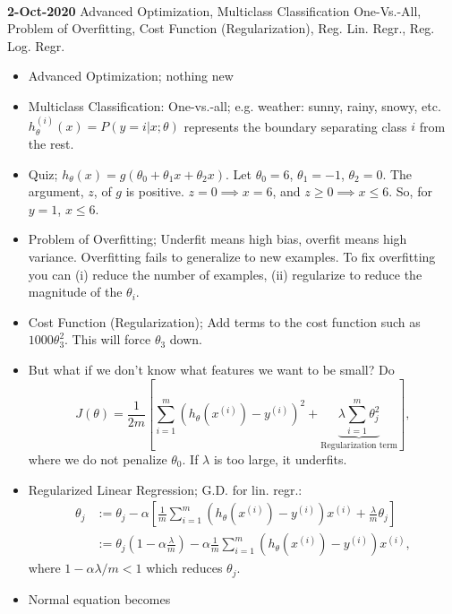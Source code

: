 \documentclass[10pt]{article}
\begin{document}
\hfill \\
{\large \textbf{2-Oct-2020} Advanced Optimization, Multiclass Classification One-Vs.-All, Problem of Overfitting, Cost Function (Regularization), Reg. Lin. Regr., Reg. Log. Regr.}
\begin{itemize}
  \item Advanced Optimization; nothing new
  \item Multiclass Classification: One-vs.-all; e.g. weather: sunny, rainy, snowy, etc. $h_{\theta}^{(i)}(x) = P \left( \left. y=i \right| x; \theta \right)$ represents the boundary separating class $i$ from the rest.
  \item Quiz; $h_{\theta}(x) = g(\theta_0 + \theta_1x + \theta_2x)$. Let $\theta_0=6$, $\theta_1=-1$, $\theta_2=0$. The argument, $z$, of $g$ is positive.  $z=0 \implies x=6$, and $z \geq 0 \implies x \leq 6$. So, for $y=1$, $x \leq 6$.
  \item Problem of Overfitting; Underfit means high bias, overfit means high variance. Overfitting fails to generalize to new examples. To fix overfitting you can (i) reduce the number of examples, (ii) regularize to reduce the magnitude of the $\theta_i$.
  \item Cost Function (Regularization); Add terms to the cost function such as $1000\theta_3^2$. This will force $\theta_3$ down.
  \item But what if we don't know what features we want to be small? Do
    \begin{equation*}
      J(\theta) = \frac{1}{2m} \left[ \sum_{i=1}^m \left( h_{\theta}(x^{(i)}) - y^{(i)}\right)^2  + \underbrace{\lambda \sum_{i=1}^m \theta_j^2}_{\text{Regularization term}} \right],
    \end{equation*}
    where we do not penalize $\theta_0$. If $\lambda$ is too large, it underfits.
  \item Regularized Linear Regression; G.D. for lin. regr.:
    \begin{align*}
      \theta_j &:= \theta_j - \alpha \left[ \frac{1}{m} \sum_{i=1}^m \left( h_{\theta}(x^{(i)}) - y^{(i)} \right)x^{(i)} + \frac{\lambda}{m}\theta_j \right] \\
      &:= \theta_j \left( 1 - \alpha \frac{\lambda}{m} \right) - \alpha \frac{1}{m} \sum_{i=1}^m \left( h_{\theta}(x^{(i)}) - y^{(i)} \right)x^{(i)},
    \end{align*}
    where $1 - \alpha \lambda/m < 1$ which reduces $\theta_j$.
  \item Normal equation becomes 
    \begin{equation*}

\end{equation*}
\end{itemize}
\end{document}

